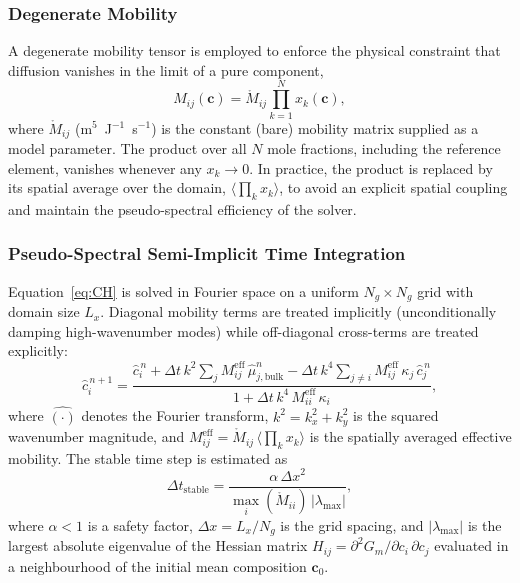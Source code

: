 \subsubsection{Degenerate Mobility}
A degenerate mobility tensor is employed to enforce the physical
constraint that diffusion vanishes in the limit of a pure component,
\begin{equation}
  M_{ij}(\bm{c}) = \mathring{M}_{ij}
    \prod_{k=1}^{N} x_k(\bm{c}),
  \label{eq:mobility}
\end{equation}
where $\mathring{M}_{ij}$ (m$^5$~J$^{-1}$~s$^{-1}$) is the
constant (bare) mobility matrix supplied as a model parameter.
The product over all $N$ mole fractions, including the reference
element, vanishes whenever any $x_k \to 0$.  In practice, the
product is replaced by its spatial average over the domain,
$\langle \prod_k x_k \rangle$, to avoid an explicit spatial
coupling and maintain the pseudo-spectral efficiency of the solver.

\subsubsection{Pseudo-Spectral Semi-Implicit Time Integration}
Equation~\eqref{eq:CH} is solved in Fourier space on a uniform
$N_g\times N_g$ grid with domain size $L_x$.  Diagonal mobility
terms are treated implicitly (unconditionally damping high-wavenumber
modes) while off-diagonal cross-terms are treated explicitly:
\begin{equation}
  \hat{c}_i^{\,n+1}
  = \frac{
      \hat{c}_i^{\,n}
      + \Delta t\,k^2 \sum_j M_{ij}^{\mathrm{eff}}\,\hat{\mu}_{j,\mathrm{bulk}}^n
      - \Delta t\,k^4 \sum_{j\neq i} M_{ij}^{\mathrm{eff}}\,\kappa_j\,\hat{c}_j^{\,n}
    }{
      1 + \Delta t\,k^4\,M_{ii}^{\mathrm{eff}}\,\kappa_i
    },
  \label{eq:semi_implicit}
\end{equation}
where $\hat{(\cdot)}$ denotes the Fourier transform,
$k^2 = k_x^2 + k_y^2$ is the squared wavenumber magnitude, and
$M_{ij}^{\mathrm{eff}} = \mathring{M}_{ij}\,\langle\prod_k x_k\rangle$
is the spatially averaged effective mobility.
The stable time step is estimated as
\begin{equation}
  \Delta t_{\mathrm{stable}}
  = \frac{\alpha\,\Delta x^2}
         {\max_i(\mathring{M}_{ii})\,|\lambda_{\max}|},
  \label{eq:dt_stable}
\end{equation}
where $\alpha < 1$ is a safety factor, $\Delta x = L_x/N_g$ is the
grid spacing, and $|\lambda_{\max}|$ is the largest absolute
eigenvalue of the Hessian matrix $H_{ij} = \partial^2 G_m/\partial
c_i\,\partial c_j$ evaluated in a neighbourhood of the initial
mean composition $\bm{c}_0$.

